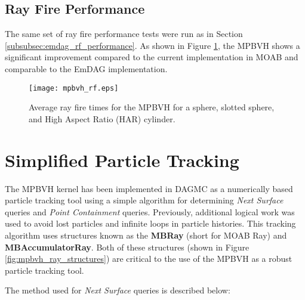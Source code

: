\subsection{Ray Fire Performance}\label{sec:mpbvh_rf_perf}

The same set of ray fire performance tests were run as in Section
\ref{subsubsec:emdag_rf_performance}. As shown in Figure
\ref{fig:mpbvh_rf_tests}, the MPBVH shows a significant improvement compared to
the current implementation in MOAB and comparable to the EmDAG implementation.

\begin{figure}[H]
  \centering
  \texttt{[image: mpbvh\_rf.eps]}
  \caption{Average ray fire times for the MPBVH for a sphere, slotted sphere, and High Aspect Ratio (HAR) cylinder.}
  \label{fig:mpbvh_rf_tests}
\end{figure}

\section{Simplified Particle Tracking}

The MPBVH kernel has been implemented in DAGMC as a numerically based particle
tracking tool using a simple algorithm for determining \textit{Next Surface}
queries and \textit{Point Containment} queries. Previously, additional logical
work was used to avoid lost particles and infinite loops in particle
histories. This tracking algorithm uses structures known as the \textbf{MBRay}
(short for MOAB Ray) and \textbf{MBAccumulatorRay}. Both of these structures
(shown in Figure \ref{fig:mpbvh_ray_structures}) are critical to the use of the
MPBVH as a robust particle tracking tool.

The method used for \textit{Next Surface} queries is described below:

